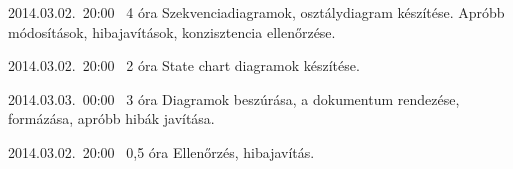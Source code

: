 \begin{naplo}
\bejegyzes
{2014.03.02.~20:00~}
{4 óra}
{\vantal}
{Szekvenciadiagramok, osztálydiagram készítése. Apróbb módosítások, hibajavítások, konzisztencia ellenőrzése.}

\bejegyzes
{2014.03.02.~20:00~}
{2 óra}
{\vadam}
{State chart diagramok készítése.}

\bejegyzes
{2014.03.03.~00:00~}
{3 óra}
{\vtorok}
{Diagramok beszúrása, a dokumentum rendezése, formázása, apróbb hibák javítása.}

\bejegyzes
{2014.03.02.~20:00~}
{0,5 óra}
{\vbator}
{Ellenőrzés, hibajavítás.}

\end{naplo}

